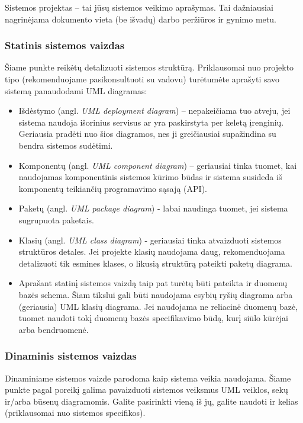 \documentclass{ktuthesis}
\begin{document}
  Sistemos projektas – tai jūsų sistemos veikimo aprašymas. Tai dažniausiai nagrinėjama dokumento vieta (be išvadų) darbo peržiūros ir gynimo metu.

  \subsubsection{Statinis sistemos vaizdas}

  Šiame punkte reikėtų detalizuoti sistemos struktūrą. Priklausomai nuo projekto tipo (rekomenduojame pasikonsultuoti su vadovu) turėtumėte aprašyti
  savo sistemą panaudodami UML diagramas:
  \begin{itemize}[label={--}]
    \item Išdėstymo (angl. \textit{UML deployment diagram}) – nepakeičiama tuo atveju, jei sistema naudoja išorinius servisus ar yra paskirstyta
    per keletą įrenginių. Geriausia pradėti nuo šios diagramos, nes ji greičiausiai supažindina su bendra sistemos sudėtimi.
    \item Komponentų (angl. \textit{UML component diagram}) – geriausiai tinka tuomet, kai naudojamas komponentinis sistemos kūrimo būdas ir sistema
    susideda iš komponentų teikiančių programavimo sąsają (API).
    \item Paketų (angl. \textit{UML package diagram}) - labai naudinga tuomet, jei sistema sugrupuota paketais.
    \item Klasių (angl. \textit{UML class diagram}) - geriausiai tinka atvaizduoti sistemos struktūros detales. Jei projekte klasių naudojama daug,
    rekomenduojama detalizuoti tik esmines klases, o likusią struktūrą pateikti paketų diagrama.
    \item Aprašant statinį sistemos vaizdą taip pat turėtų būti pateikta ir duomenų bazės schema. Šiam tikslui gali būti naudojama esybių ryšių diagrama arba (geriausia)
    UML klasių diagrama. Jei naudojama ne reliacinė duomenų bazė, tuomet naudoti tokį duomenų bazės specifikavimo būdą, kurį siūlo kūrėjai arba bendruomenė.
  \end{itemize}

  \subsubsection{Dinaminis sistemos vaizdas}

  Dinaminiame sistemos vaizde parodoma kaip sistema veikia naudojama. Šiame
  punkte pagal poreikį galima pavaizduoti sistemos veiksmus UML veiklos, sekų
  ir/arba būsenų diagramomis. Galite pasirinkti vieną iš jų, galite naudoti ir
  kelias (priklausomai nuo sistemos specifikos).
\end{document}
